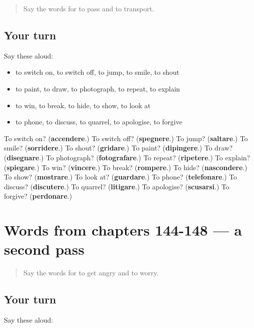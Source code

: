 \begin{quote}
Say the words for to pass and to transport.
\end{quote}

\subsection*{Your turn}
Say these aloud:

\begin{itemize}
\raggedright
  \item to switch on, to switch off, to jump, to smile, to shout
  \item to paint, to draw, to photograph, to repeat, to explain
  \item to win, to break, to hide, to show, to look at
  \item to phone, to discuss, to quarrel, to apologise, to forgive
\end{itemize}

\begin{tcolorbox}[breakable,colback=teal!4,colframe=teal!35!black,title={Before you move on}]
To switch on? (\textbf{accendere}.) To switch off? (\textbf{spegnere}.) To jump? (\textbf{saltare}.) To smile? (\textbf{sorridere}.) To shout? (\textbf{gridare}.) To paint? (\textbf{dipingere}.) To draw? (\textbf{disegnare}.) To photograph? (\textbf{fotografare}.) To repeat? (\textbf{ripetere}.) To explain? (\textbf{spiegare}.) To win? (\textbf{vincere}.) To break? (\textbf{rompere}.) To hide? (\textbf{nascondere}.) To show? (\textbf{mostrare}.) To look at? (\textbf{guardare}.) To phone? (\textbf{telefonare}.) To discuss? (\textbf{discutere}.) To quarrel? (\textbf{litigare}.) To apologise? (\textbf{scusarsi}.) To forgive? (\textbf{perdonare}.)
\end{tcolorbox}
\section[(dialogue)]{Words from chapters 144-148 — a second pass}

\label{lesson:IT-R148-second-pass-words-from-chapters-144-148}



\begin{quote}
Say the words for to get angry and to worry.
\end{quote}

\subsection*{Your turn}
Say these aloud:

